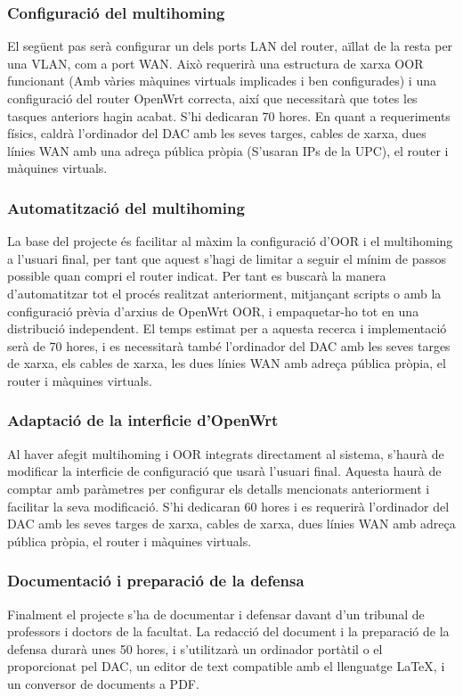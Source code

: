 \documentclass[11pt]{article}
\begin{document}
\subsubsection{Configuració del multihoming}
El següent pas serà configurar un dels ports LAN del router, aïllat de la resta per una VLAN, com a port WAN. Això requerirà una estructura de xarxa OOR funcionant (Amb vàries màquines virtuals implicades i ben configurades) i una configuració del router OpenWrt  correcta, així que necessitarà que totes les tasques anteriors hagin acabat. S’hi dedicaran 70 hores. En quant a requeriments físics, caldrà l’ordinador del DAC amb les seves targes, cables de xarxa, dues línies WAN amb una adreça pública pròpia (S’usaran IPs de la UPC), el router i màquines virtuals.
\subsubsection{Automatització del multihoming}
La base del projecte és facilitar al màxim la configuració d’OOR i el multihoming a l’usuari final, per tant que aquest s’hagi de limitar a seguir el mínim de passos possible quan compri el router indicat. Per tant es buscarà la manera d’automatitzar tot el procés realitzat anteriorment, mitjançant scripts o amb la configuració prèvia d’arxius de OpenWrt OOR, i empaquetar-ho tot en una distribució independent. El temps estimat per a aquesta recerca i implementació serà de 70 hores, i es necessitarà també l’ordinador del DAC amb les seves targes de xarxa, els cables de xarxa, les dues línies WAN amb adreça pública pròpia, el router i màquines virtuals.
\subsubsection{Adaptació de la interficie d’OpenWrt}
Al haver afegit multihoming i OOR integrats directament al sistema, s’haurà de modificar la interficie de configuració que usarà l’usuari final. Aquesta haurà de comptar amb paràmetres per configurar els detalls mencionats anteriorment i facilitar la seva modificació. S’hi dedicaran 60 hores i es requerirà l’ordinador del DAC amb les seves targes de xarxa, cables de xarxa, dues línies WAN amb adreça pública pròpia, el router i màquines virtuals.
\subsubsection{Documentació i preparació de la defensa}
Finalment el projecte s’ha de documentar i defensar davant d’un tribunal de professors i doctors de la facultat. La redacció del document i la preparació de la defensa durarà unes 50 hores, i s’utilitzarà un ordinador portàtil o el proporcionat pel DAC, un editor de text compatible amb el llenguatge LaTeX, i un conversor de documents a PDF.
\end{document}
